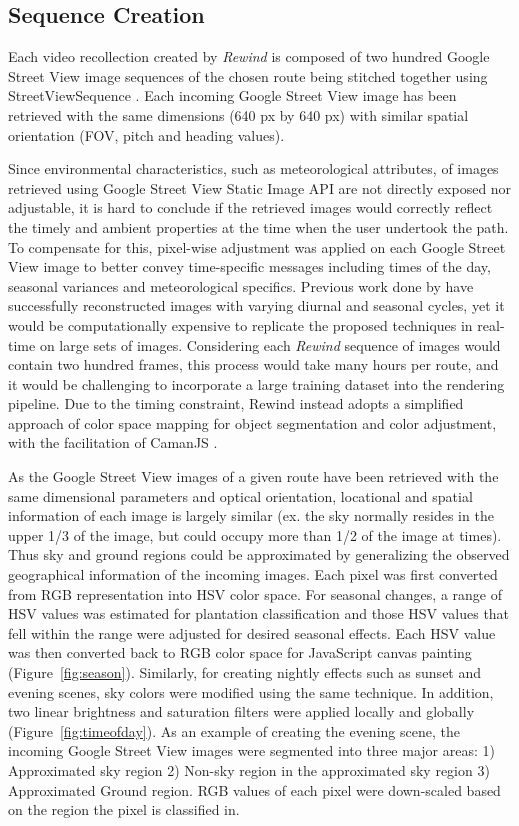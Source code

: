 \documentclass{sigchi}
\begin{document}
\subsection{Sequence Creation}
Each video recollection created by \textit{Rewind} is composed of two hundred Google Street View image sequences of the chosen route being stitched together using StreetViewSequence \cite{streetviewsequence}. Each incoming Google Street View image has been retrieved with the same dimensions (640 px by 640 px) with similar spatial orientation (FOV, pitch and heading values).

Since environmental characteristics, such as meteorological attributes, of images retrieved using Google Street View Static Image API are not directly exposed nor adjustable, it is hard to conclude if the retrieved images would correctly reflect the timely and ambient properties at the time when the user undertook the path. To compensate for this, pixel-wise adjustment was applied on each Google Street View image to better convey time-specific messages including times of the day, seasonal variances and meteorological specifics. Previous work done by \cite{laffont2014transient,shih2013data} have successfully reconstructed images with varying diurnal and seasonal cycles, yet it would be computationally expensive to replicate the proposed techniques in real-time on large sets of images. Considering each \textit{Rewind} sequence of images would contain two hundred frames, this process would take many hours per route, and it would be challenging to incorporate a large training dataset into the rendering pipeline. Due to the timing constraint, Rewind instead adopts a simplified approach of color space mapping for object segmentation and color adjustment, with the facilitation of CamanJS \cite{caman}.

As the Google Street View images of a given route have been retrieved with the same dimensional parameters and optical orientation, locational and spatial information of each image is largely similar (ex. the sky normally resides in the upper 1/3 of the image, but could occupy more than 1/2 of the image at times). Thus sky and ground regions could be approximated by generalizing the observed geographical information of the incoming images. Each pixel was first converted from RGB representation into HSV color space. For seasonal changes, a range of HSV values was estimated for plantation classification and those HSV values that fell within the range were adjusted for desired seasonal effects. Each HSV value was then converted back to RGB color space for JavaScript canvas painting (Figure~\ref{fig:season}). Similarly, for creating nightly effects such as sunset and evening scenes, sky colors were modified using the same technique. In addition, two linear brightness and saturation filters were applied locally and globally (Figure~\ref{fig:timeofday}). As an example of creating the evening scene, the incoming Google Street View images were segmented into three major areas: 1) Approximated sky region 2) Non-sky region in the approximated sky region 3) Approximated Ground region. RGB values of each pixel were down-scaled based on the region the pixel is classified in. 
\end{document}
